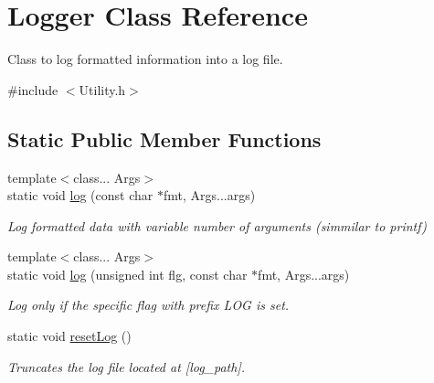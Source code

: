 \hypertarget{classLogger}{}\section{Logger Class Reference}
\label{classLogger}


Class to log formatted information into a log file.  




{\ttfamily \#include $<$Utility.\+h$>$}

\subsection*{Static Public Member Functions}
\begin{DoxyCompactItemize}
\item 
{\footnotesize template$<$class... Args$>$ }\\static void \hyperlink{classLogger_aad1588639bb45eab5a33a40fc58d0e94}{log} (const char $\ast$fmt, Args...\+args)
\begin{DoxyCompactList}\small\item\em Log formatted data with variable number of arguments (simmilar to printf) \end{DoxyCompactList}\item 
{\footnotesize template$<$class... Args$>$ }\\static void \hyperlink{classLogger_ac5ac87e0629a7b4073a57798026df92a}{log} (unsigned int flg, const char $\ast$fmt, Args...\+args)
\begin{DoxyCompactList}\small\item\em Log only if the specific flag with prefix L\+OG is set. \end{DoxyCompactList}\item 
static void \hyperlink{classLogger_a8b31dfd3a063f40f232f0549e962132d}{reset\+Log} ()
\begin{DoxyCompactList}\small\item\em Truncates the log file located at \mbox{[}log\+\_\+path\mbox{]}. \end{DoxyCompactList}\end{DoxyCompactItemize}
